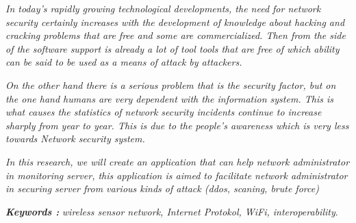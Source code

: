 \documentclass{jtetiskripsi}
\begin{document}
\begin{abstracteng}
\emph { In today's rapidly growing technological developments, the need for network security certainly increases with the development of knowledge about hacking and cracking problems that are free and some are commercialized. Then from the side of the software support is already a lot of tool tools that are free of which ability can be said to be used as a means of attack by attackers.}
 
\emph{ On the other hand there is a serious problem that is the security factor, but on the one hand humans are very dependent with the information system. This is what causes the statistics of network security incidents continue to increase sharply from year to year. This is due to the people's awareness which is very less towards Network security system.}
 
\emph{ In this research, we will create an application that can help network administrator in monitoring server, this application is aimed to facilitate network administrator in securing server from various kinds of attack (ddos, scaning, brute force) }
 
\bigskip
\noindent
\textbf{\emph{Keywords :}} \emph{wireless sensor network, Internet Protokol, WiFi, interoperability}.
\end{abstracteng}














\end{document}
